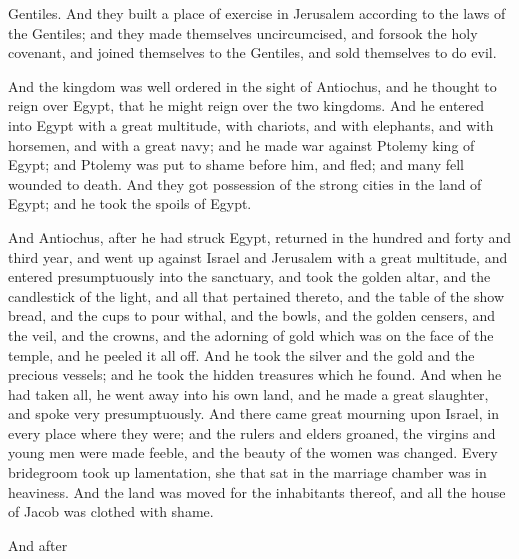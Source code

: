 { Gentiles.
And
 they built a place of exercise in Jerusalem according to the laws of the
 Gentiles;
and they made themselves uncircumcised, and forsook the holy covenant, and joined themselves to the
 Gentiles, and sold themselves to do evil.
\par }{\PP {}And the kingdom was well ordered in the sight of Antiochus, and he thought to reign over Egypt, that he might reign over the two kingdoms.
And he entered into Egypt with a
 great multitude, with chariots, and with elephants, and with horsemen, and with a great
 navy;
and he made war against Ptolemy king of Egypt; and Ptolemy was put to shame before him, and fled; and many fell wounded to death.
And they got possession of the strong cities in the land of Egypt; and he took the spoils of Egypt.
\par }{\PP {}And Antiochus, after he had struck Egypt, returned in
 the hundred and forty and third year, and went up against Israel and Jerusalem with a
 great multitude,
and entered presumptuously into the sanctuary, and took the golden altar, and the candlestick of the light, and all that pertained thereto,
and the table of the show bread, and the cups to pour withal, and the bowls, and the golden censers, and the veil, and the crowns, and the adorning of gold which was on the face of the temple, and he peeled it all off.
And he took the silver and the gold and the precious vessels; and he took the hidden treasures which he found.
And when he had taken all, he went away into his own land, and he made a great slaughter, and spoke very presumptuously.
And there came great mourning upon Israel, in every place where they were;
and the rulers and elders groaned, the virgins and young men were made feeble, and the beauty of the women was changed.
Every bridegroom took up lamentation, she that sat in the marriage chamber was in heaviness.
And the land was moved for the inhabitants thereof, and all the house of Jacob was clothed with shame.
\par }{\PP {}And
 after
}

